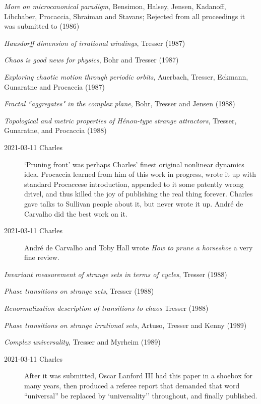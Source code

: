 {\em More on microcanonical paradigm},
{Bensimon, Halsey, Jensen, Kadanoff,
Libchaber, Procaccia,  Shraiman and Stavans};
{Rejected from all proceedings it was submitted to}
{(1986)}

{\em Hausdorff dimension of irrational windings},
{Tresser}
{(1987)}

 {\em Chaos is good news for physics},
{Bohr and Tresser}
{(1987)}

{\em Exploring chaotic motion through periodic orbits},
{Auerbach, Tresser, Eckmann, Gunaratne and Procaccia}
{(1987)}

{\em Fractal ``aggregates" in the complex plane},
{Bohr, Tresser and Jensen}
{(1988)}

{\em Topological and metric properties of {H{\'e}non}-type strange attractors},
{Tresser, Gunaratne, and Procaccia}
{(1988)}
\begin{description}
  \item[2021-03-11 Charles]
`Pruning front' was perhaps Charles' finest original nonlinear dynamics
idea. Procaccia learned from him of this work in progress,  wrote it up
with standard Procaccese introduction, appended to it some patently wrong
drivel, and thus killed the joy of publishing the real thing forever.
Charles gave talks to Sullivan people about it, but never wrote it up.
Andr{\'{e}} de Carvalho did the best work on it.
  \item[2021-03-11 Charles]
Andr{\'{e}} de Carvalho and Toby Hall wrote
{\em How to prune a horseshoe}
a very fine review.
\end{description}

{\em Invariant measurement of strange sets in terms of cycles},
{Tresser}
{(1988)}

{\em Phase transitions on strange sets},
{Tresser}
{(1988)}

{\em Renormalization description of transitions to chaos}
{Tresser}
{(1988)}

{\em Phase transitions on strange irrational sets},
{Artuso, Tresser and Kenny}
{(1989)}

{\em Complex universality},
{Tresser and Myrheim}
{(1989)}
\begin{description}
  \item[2021-03-11 Charles]
After it was submitted, 
{Oscar Lanford III} had this paper in a shoebox for many
years, then produced a referee report that demanded that
word ``universal'' be replaced by `universality'' throughout, and
finally published.
\end{description}


